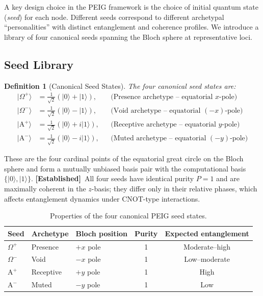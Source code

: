 \documentclass[12pt]{article}
\newtheorem{definition}{Definition}
\newcommand{\established}{\textbf{[Established]}}
\newcommand{\Alpha}{\mathrm{A}}
\newcommand{\ket}[1]{|#1\rangle}
\begin{document}
A key design choice in the PEIG framework is the choice of initial
quantum state (\emph{seed}) for each node.  Different seeds correspond to
different archetypal ``personalities'' with distinct entanglement and
coherence profiles.  We introduce a library of four canonical seeds
spanning the Bloch sphere at representative loci.

\subsection{Seed Library}

\begin{definition}[Canonical Seed States]
\label{def:seeds}
The four canonical seed states are:
\begin{align}
\ket{\Omega^+} &= \tfrac{1}{\sqrt{2}}(\ket{0}+\ket{1}), &
&\text{(Presence archetype -- equatorial $x$-pole)}\label{eq:omegaplus}\\
\ket{\Omega^-} &= \tfrac{1}{\sqrt{2}}(\ket{0}-\ket{1}), &
&\text{(Void archetype -- equatorial $(-x)$-pole)}\label{eq:omegaminus}\\
\ket{\Alpha^+} &= \tfrac{1}{\sqrt{2}}(\ket{0}+i\ket{1}), &
&\text{(Receptive archetype -- equatorial $y$-pole)}\label{eq:alphaplus}\\
\ket{\Alpha^-} &= \tfrac{1}{\sqrt{2}}(\ket{0}-i\ket{1}), &
&\text{(Muted archetype -- equatorial $(-y)$-pole)}\label{eq:alphaminus}
\end{align}
\end{definition}

These are the four cardinal points of the equatorial great circle on the
Bloch sphere and form a mutually unbiased basis pair with the computational
basis $\{\ket{0},\ket{1}\}$.  \established\ All four seeds have identical
purity $P=1$ and are maximally coherent in the $z$-basis; they differ
only in their relative phases, which affects entanglement dynamics under
CNOT-type interactions.

\begin{table}[H]
\centering
\caption{Properties of the four canonical PEIG seed states.}
\label{tab:seeds}
\begin{tabular}{lllcc}
\toprule
\textbf{Seed} & \textbf{Archetype} & \textbf{Bloch position} &
\textbf{Purity} & \textbf{Expected entanglement}\\
\midrule
$\Omega^+$ & Presence  & $+x$ pole & 1 & Moderate--high\\
$\Omega^-$ & Void      & $-x$ pole & 1 & Low--moderate\\
$\Alpha^+$ & Receptive & $+y$ pole & 1 & High\\
$\Alpha^-$ & Muted     & $-y$ pole & 1 & Low\\
\bottomrule
\end{tabular}
\end{table}
\end{document}
